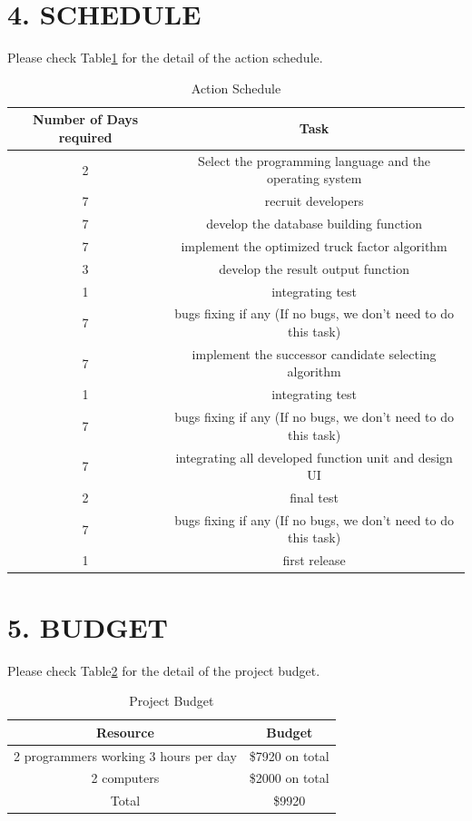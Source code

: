 \documentclass[12pt, a4paper, openright]{report}
\begin{document}
\section* {4. SCHEDULE}
Please check Table\ref{schedule} for the detail of the action schedule.
\begin{table}[h]		
	\centering            
	\caption{Action Schedule}            
	\begin{tabular}{|c|c|}            
		\hline Number of Days required & Task   \\ \hline
		  2 & Select the programming language and the operating system \\ \hline
		  7 & recruit developers  \\ \hline
		  7 & develop the database building function  \\ \hline
          7 & implement the optimized truck factor algorithm  \\ \hline
          3 & develop the result output function \\ \hline
          1 & integrating test  \\ \hline
          7 & bugs fixing if any  (If no bugs, we don't need to do this task)\\ \hline
          7 & implement the successor candidate selecting algorithm \\ \hline
          1 & integrating test  \\ \hline
          7 & bugs fixing if any  (If no bugs, we don't need to do this task)\\ \hline
          7 & integrating all developed function unit and design UI  \\ \hline
          2 & final test \\ \hline
          7 & bugs fixing if any  (If no bugs, we don't need to do this task)\\ \hline
          1 & first release  \\ \hline
	\end{tabular}            
	\label{schedule}            
\end{table}
\newpage
\section* {5. BUDGET}
Please check Table\ref{budget} for the detail of the project budget.
\begin{table}[h]		
	\centering            
	\caption{Project Budget}            
	\begin{tabular}{|c|c|}            
		\hline Resource & Budget   \\ \hline
		2 programmers working 3 hours per day& \$7920 on total \\ \hline
        2 computers& \$2000 on total \\ \hline
        Total& \$9920  \\ \hline
	\end{tabular}            
	\label{budget}            
\end{table}
\end{document}
